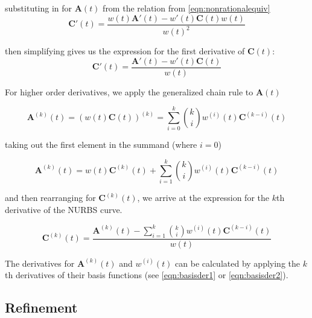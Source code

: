 substituting in for \(\textbf{A}(t)\) from the relation from \cref{eqn:nonrationalequiv}
\begin{equation} 
	\textbf{C}'(t) = \frac{  w(t)\textbf{A}'(t) - w'(t) \textbf{C}(t)w(t) }{ w(t)^2 }
\end{equation}

then simplifying gives us the expression for the first derivative of \(\textbf{C}(t) \):
\begin{equation} 
\textbf{C}'(t) = \frac{ \textbf{A}'(t) - w'(t) \textbf{C}(t) }{ w(t) }
\end{equation}

For higher order derivatives, we apply the generalized chain rule to \(\textbf{A}(t)\)

\begin{equation} 
\textbf{A}^{(k)}(t) = (w(t)\textbf{C}(t))^{(k)} = \displaystyle \sum^k_{i=0}\binom{k}i w^{(i)} (t) \textbf{C}^{(k-i)} (t) 
\end{equation}

taking out the first element in the summand (where $i=0$)

\begin{equation} 
\textbf{A}^{(k)}(t) = w(t)\textbf{C}^{(k)}(t) + \displaystyle \sum^k_{i=1}\binom{k}i w^{(i)} (t) \textbf{C}^{(k-i)} (t) 
\end{equation}

and then rearranging for \(\textbf{C}^{(k)}(t)\), we arrive at the expression for the $k$th derivative of the NURBS curve.

\begin{equation} 
	\textbf{C}^{(k)}(t) = \frac{ \textbf{A}^{(k)}(t) - \displaystyle \sum^k_{i=1} \binom{k}i w^{(i)}(t) \textbf{C}^{(k-i)} (t) }{ w(t) }
\end{equation}

The derivatives for \(\textbf{A}^{(k)}(t)\) and \(w^{(i)}(t)\) can be calculated by applying the $k$th derivatives of their basis functions (see \cref{eqn:basisder1} or \cref{eqn:basisder2}).

\subsection{Refinement}


